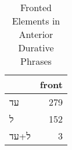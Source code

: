 \begin{table}[htbp!]
\centering
\caption{Fronted Elements in Anterior Durative Phrases}
\label{table:antdur_front}
\begin{tabular}{lr}
\toprule
{} &  front \\
\midrule
\texthebrew{עד}                &    279 \\
\texthebrew{ל}                 &    152 \\
\texthebrew{ל}+\texthebrew{עד} &      3 \\
\bottomrule
\end{tabular}
\end{table}
